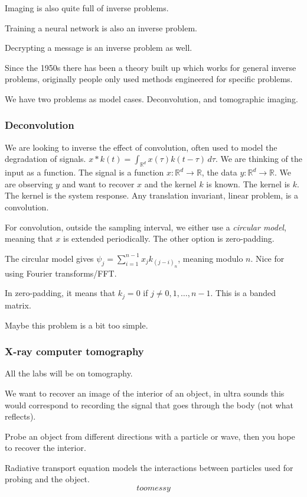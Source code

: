 \documentclass[12pt]{article}
\theoremstyle{definition}
\newcommand{\real}{\mathbb{R}}   %
\begin{document}
Imaging is also quite full of inverse problems.

Training a neural network is also an inverse problem.

Decrypting a message is an inverse problem as well.

Since the 1950s there has been a theory built up which works for general inverse problems, originally people only used methods engineered for specific problems.

We have two problems as model cases. Deconvolution, and tomographic imaging.

\subsubsection{Deconvolution}
We are looking to inverse the effect of convolution, often used to model the degradation of signals. $x*k(t)= \int_{\real^d} x(\tau)k(t-\tau) \,d\tau $. We are thinking of the input as a function. The signal is a function $x:\real^d\to\real$, the data $y:\real^d\to\real$. We are observing $y$ and want to recover $x$ and the kernel $k$ is known. The kernel is $k$. The kernel is the system response. Any translation invariant, linear problem, is a convolution.

For convolution, outside the sampling interval, we either use a \textit{circular model}, meaning that $x$ is extended periodically. The other option is zero-padding.

The circular model gives $\psi_j= \sum_{i=1}^{n-1} x_jk_{(j-i)_n}$, meaning modulo $n$. Nice for using Fourier transforms/FFT.

In zero-padding, it means that $k_j=0$ if $j\neq 0,1,\dots,n-1$. This is a banded matrix.

Maybe this problem is a bit too simple.
\subsubsection{X-ray computer tomography}
All the labs will be on tomography.

We want to recover an image of the interior of an object, in ultra sounds this would correspond to recording the signal that goes through the body (not what reflects). 

Probe an object from different directions with a particle or wave, then you hope to recover the interior. 

Radiative transport equation models the interactions between particles used for probing and the object.
\begin{equation*}
    too messy
\end{equation*}
\end{document}
